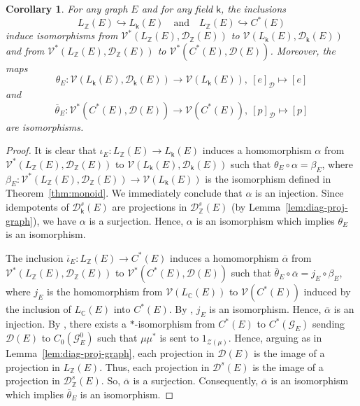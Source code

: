 \documentclass[11pt, letterpaper,final]{amsart}
\newcommand{\ZZ}{\mathbb{Z}}
\newcommand{\CC}{\mathbb{C}}
\newcommand{\V}{\mathcal{V}}
\newcommand{\D}{\mathcal{D}}
\newcommand{\Z}{\mathcal{Z}}
\newtheorem{cor}[thm]{Corollary}
\theoremstyle{definition}
\theoremstyle{remark}
\begin{document}
\begin{cor}\label{cor:monoid}
For any graph $E$ and for any field $\mathsf{k}$, the inclusions 
\[
L_\ZZ(E) \hookrightarrow L_\mathsf{k}(E) \quad \text{and} \quad L_\ZZ(E) \hookrightarrow C^*(E)
\]
induce isomorphisms from $\V^*( L_\ZZ(E), \D_\ZZ(E))$ to $\V( L_\mathsf{k}(E), \D_\mathsf{k}(E))$ and from $\V^*( L_\ZZ(E), \D_\ZZ(E))$ to $\V^*( C^*(E), \D(E))$.  Moreover, the maps 
\[\theta_E \colon \V( L_\mathsf{k}(E), \D_\mathsf{k}(E)) \to \V(L_\mathsf{k}(E)), \ [e]_\D \mapsto [e] \] and 
\[\overline{\theta}_E \colon \V^*( C^*(E), \D(E)) \to  \V(C^*(E)), \ [p]_\D \mapsto [p]\] 
are isomorphisms.
\end{cor}

\begin{proof}
It is clear that $\iota_E \colon L_\ZZ(E) \to L_\mathsf{k}(E)$ induces a homomorphism $\alpha$ from $\V^*(L_\ZZ(E), \D_\ZZ(E))$ to $\V( L_\mathsf{k}(E), \D_\mathsf{k}(E))$ such that $\theta_E \circ \alpha = \beta_E$, where $\beta_E \colon \V^*(L_\ZZ(E), \D_\ZZ(E)) \to \V(L_\mathsf{k}(E))$ is the isomorphism defined in Theorem~\ref{thm:monoid}.  We immediately conclude that $\alpha$ is an injection.  Since idempotents of $\D_\mathsf{k}^s(E)$ are projections in $\D_\ZZ^s(E)$ (by Lemma~\ref{lem:diag-proj-graph}), we have $\alpha$ is a surjection.  Hence, $\alpha$ is an isomorphism which implies $\theta_E$ is an isomorphism.

The inclusion $\overline{\iota}_E \colon L_\ZZ(E) \to C^*(E)$ induces a homomorphism $\overline{\alpha}$ from $\V^*(L_\ZZ(E), \D_\ZZ(E))$ to $\V^*( C^*(E), \D(E))$ such that $\overline{\theta}_E \circ \overline{\alpha} = j_E \circ \beta_E$, where $j_E$ is the homomorphism from $\V(L_\CC(E))$ to $\V(C^*(E))$ induced by the inclusion of $L_\CC(E)$ into $C^*(E)$.  By \cite[Corollary~3.5]{HLMRT}, $j_E$ is an isomorphism.  Hence, $\overline{\alpha}$ is an injection.  By \cite[Proposition~4.1]{KPRR}, there exists a $*$-isomorphism from $C^*(E)$ to $C^*(\mathcal{G}_E)$ sending $\D(E)$ to $C_0( \mathcal{G}_E^0)$ such that $\mu \mu^*$ is sent to $1_{\Z(\mu)}$.  Hence, arguing as in Lemma~\ref{lem:diag-proj-graph}, each projection in $\D(E)$ is the image of a projection in $L_\ZZ(E)$.  Thus, each projection in $\D^s(E)$ is the image of a projection in $\D_\ZZ^s(E)$.  So, $\overline{\alpha}$ is a surjection.  Consequently, $\overline{\alpha}$ is an isomorphism which implies $\overline{\theta}_E$ is an isomorphism.
\end{proof}
\end{document}
